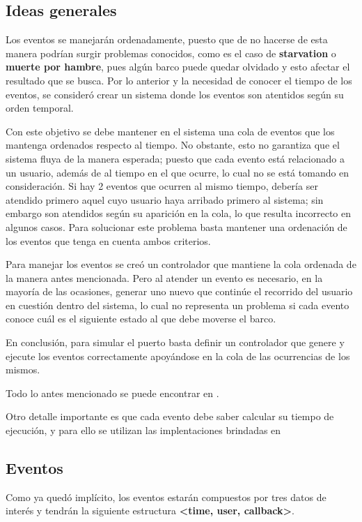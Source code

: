 	\subsection{Ideas generales}
	
		Los eventos se manejar\'an ordenadamente, puesto que de
		no hacerse de esta manera podr\'ian surgir problemas conocidos, como es el caso de {\bf{starvation}} o 
		{\bf{muerte por hambre}}, pues alg\'un barco puede quedar olvidado y esto afectar el resultado 
		que se busca. Por lo anterior y la necesidad de conocer el tiempo de los eventos, se consider\'o crear un sistema donde los eventos son atentidos seg\'un su orden temporal.

		Con este objetivo se debe mantener en el sistema una cola de eventos que los mantenga ordenados
		respecto al tiempo. No obstante, esto no garantiza que el sistema fluya de la manera esperada; puesto que cada evento est\'a relacionado a un usuario, adem\'as de al tiempo en el que ocurre, lo cual no se est\'a tomando en consideraci\'on. Si hay 2 eventos que ocurren al mismo tiempo, deber\'ia ser atendido primero aquel cuyo usuario haya arribado primero al sistema; sin embargo son atendidos seg\'un su aparici\'on en la cola, lo que resulta incorrecto en algunos casos. Para solucionar este problema basta mantener una ordenaci\'on de los	eventos que tenga en cuenta ambos criterios.

		Para manejar los eventos se cre\'o un controlador que mantiene la cola ordenada de la manera antes mencionada. Pero al atender un evento es necesario, en la mayor\'ia de las ocasiones, generar uno nuevo que contin\'ue el recorrido del usuario	en cuesti\'on dentro del sistema, lo cual no representa un problema si cada evento conoce cu\'al es el siguiente estado al que debe moverse el barco.

		En conclusi\'on, para simular el puerto basta definir un controlador que genere y 
		ejecute los eventos correctamente apoy\'andose en la cola de las ocurrencias de los mismos.

		Todo lo antes mencionado se puede encontrar en \cite{harbor}.

		Otro detalle importante es que cada evento debe saber calcular su tiempo de
		ejecuci\'on, y para ello se utilizan las implentaciones brindadas en \cite{utils}

	\subsection{Eventos}
		Como ya qued\'o impl\'icito, los eventos estar\'an compuestos por tres datos de 
		inter\'es y tendr\'an la siguiente estructura {\bf{<time, user, callback>}}.

